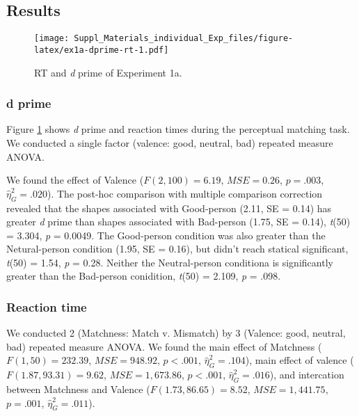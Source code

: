 \documentclass[man]{apa6}
\begin{document}
\hypertarget{results}{%
\subsection{Results}\label{results}}

\begin{figure}
\centering
\texttt{[image: Suppl\_Materials\_individual\_Exp\_files/figure-latex/ex1a-dprime-rt-1.pdf]}
\caption{\label{fig:ex1a-dprime-rt}RT and \emph{d} prime of Experiment 1a.}
\end{figure}

\hypertarget{d-prime}{%
\subsubsection{d prime}\label{d-prime}}

Figure \ref{fig:ex1a-dprime-rt} shows \emph{d} prime and reaction times during the perceptual matching task. We conducted a single factor (valence: good, neutral, bad) repeated measure ANOVA.

We found the effect of Valence (\(F(2, 100) = 6.19\), \(\mathit{MSE} = 0.26\), \(p = .003\), \(\hat{\eta}^2_G = .020\)). The post-hoc comparison with multiple comparison correction revealed that the shapes associated with Good-person (2.11, SE = 0.14) has greater \emph{d} prime than shapes associated with Bad-person (1.75, SE = 0.14), \emph{t}(50) = 3.304, \emph{p} = 0.0049. The Good-person condition was also greater than the Netural-person condition (1.95, SE = 0.16), but didn't reach statical significant, \emph{t}(50) = 1.54, \emph{p} = 0.28. Neither the Neutral-person conditiona is significantly greater than the Bad-person conidition, \emph{t}(50) = 2.109, \emph{p} = .098.

\hypertarget{reaction-time}{%
\subsubsection{Reaction time}\label{reaction-time}}

We conducted 2 (Matchness: Match v. Mismatch) by 3 (Valence: good, neutral, bad) repeated measure ANOVA. We found the main effect of Matchness (\(F(1, 50) = 232.39\), \(\mathit{MSE} = 948.92\), \(p < .001\), \(\hat{\eta}^2_G = .104\)), main effect of valence (\(F(1.87, 93.31) = 9.62\), \(\mathit{MSE} = 1,673.86\), \(p < .001\), \(\hat{\eta}^2_G = .016\)), and intercation between Matchness and Valence (\(F(1.73, 86.65) = 8.52\), \(\mathit{MSE} = 1,441.75\), \(p = .001\), \(\hat{\eta}^2_G = .011\)).
\end{document}
